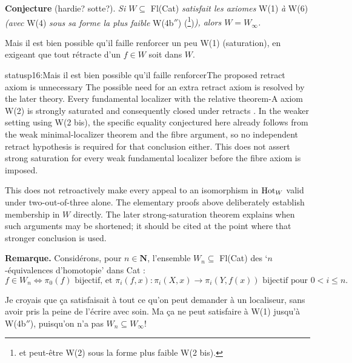 \textbf{Conjecture} (hardie? sotte?). \textit{Si $W \subseteq$} Fl(Cat) \textit{satisfait les axiomes} W(1) \textit{à} W(6) \textit{(avec} W(4) \textit{sous sa forme la plus faible} W(4b$''$) (\footnote[36]{et peut-être W(2) sous la forme plus faible W(2 bis).})\textit{), alors $W = W_\infty$.}

Mais il est bien possible qu'il faille renforcer un peu W(1) (saturation), en exigeant que tout rétracte d'un $f \in W$ soit dans $W$.

\begin{dcomment}{status}{p16:Mais il est bien possible qu'il faille renforcer}{The proposed retract axiom is unnecessary}
The possible need for an extra retract axiom is resolved by the later theory. Every fundamental localizer with the relative theorem-A axiom W(2) is strongly saturated and consequently closed under retracts \citep[Proposition~4.2.4]{Cisinski2006}. In the weaker setting using W(2 bis), the specific equality conjectured here already follows from the weak minimal-localizer theorem and the fibre argument, so no independent retract hypothesis is required for that conclusion either. This does not assert strong saturation for every weak fundamental localizer before the fibre axiom is imposed.

This does not retroactively make every appeal to an isomorphism in \(\mathrm{Hot}_W\) valid under two-out-of-three alone. The elementary proofs above deliberately establish membership in \(W\) directly. The later strong-saturation theorem explains when such arguments may be shortened; it should be cited at the point where that stronger conclusion is used.
\end{dcomment}


\textbf{Remarque.} Considérons, pour $n \in \mathbf{N}$, l'ensemble $W_n \subseteq$ Fl(Cat) des `$n$-équivalences d'homotopie' dans Cat :
\[ f \in W_n \iff \pi_0(f) \text{ bijectif, et } \pi_i(f, x) : \pi_i(X, x) \longrightarrow \pi_i(Y, f(x)) \text{ bijectif pour } 0 < i \leq n. \]

Je croyais que ça satisfaisait à tout ce qu'on peut demander à un localiseur, sans avoir pris la peine de l'écrire avec soin. Ma ça ne peut satisfaire à W(1) jusqu'à W(4b$''$), puisqu'on %
n'a pas $W_n \subseteq W_\infty$!

